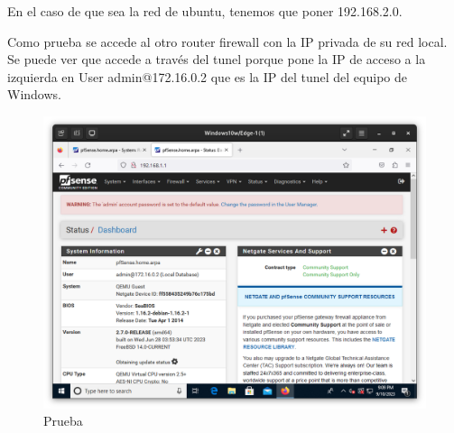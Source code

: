 En el caso de que sea la red de ubuntu, tenemos que poner 192.168.2.0.
\vspace{5mm}

Como prueba se accede al otro router firewall con la IP privada de su red local. Se puede ver que accede a través del tunel porque pone la IP de acceso a la izquierda en User admin@172.16.0.2 que es la IP del tunel del equipo de Windows.

\begin{figure}[H]
	\centering
	\includegraphics[scale=0.30]{15}
	\caption{Prueba}
\end{figure}








%



%


